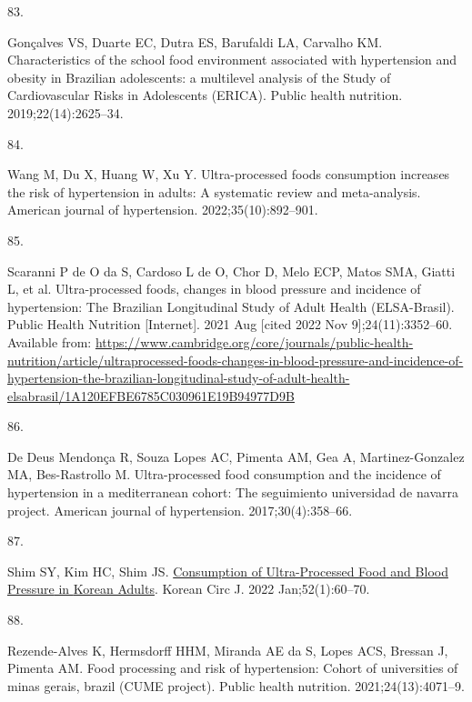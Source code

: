 \documentclass[
]{article}
\newlength{\cslhangindent}
\newlength{\csllabelwidth}
\newlength{\cslentryspacingunit} %
\newenvironment{CSLReferences}[2] %
 {%
  \setlength{\parindent}{0pt}
  \ifodd #1
  \let\oldpar\par
  \def\par{\hangindent=\cslhangindent\oldpar}
  \fi
  \setlength{\parskip}{#2\cslentryspacingunit}
 }%
 {}
\newcommand{\CSLLeftMargin}[1]{\parbox[t]{\csllabelwidth}{#1}}
\newcommand{\CSLRightInline}[1]{\parbox[t]{\linewidth - \csllabelwidth}{#1}\break}
\begin{document}
\begin{CSLReferences}{0}{0}
\leavevmode{}%
\CSLLeftMargin{83. }%
\CSLRightInline{Gonçalves VS, Duarte EC, Dutra ES, Barufaldi LA,
Carvalho KM. Characteristics of the school food environment associated
with hypertension and obesity in Brazilian adolescents: a multilevel
analysis of the Study of Cardiovascular Risks in Adolescents (ERICA).
Public health nutrition. 2019;22(14):2625--34. }

\leavevmode{}%
\CSLLeftMargin{84. }%
\CSLRightInline{Wang M, Du X, Huang W, Xu Y. Ultra-processed foods
consumption increases the risk of hypertension in adults: {A} systematic
review and meta-analysis. American journal of hypertension.
2022;35(10):892--901. }

\leavevmode{}%
\CSLLeftMargin{85. }%
\CSLRightInline{Scaranni P de O da S, Cardoso L de O, Chor D, Melo ECP,
Matos SMA, Giatti L, et al. Ultra-processed foods, changes in blood
pressure and incidence of hypertension: The {Brazilian Longitudinal
Study} of {Adult Health} ({ELSA-Brasil}). Public Health Nutrition
{[}Internet{]}. 2021 Aug {[}cited 2022 Nov 9{]};24(11):3352--60.
Available from:
\url{https://www.cambridge.org/core/journals/public-health-nutrition/article/ultraprocessed-foods-changes-in-blood-pressure-and-incidence-of-hypertension-the-brazilian-longitudinal-study-of-adult-health-elsabrasil/1A120EFBE6785C030961E19B94977D9B}}

\leavevmode{}%
\CSLLeftMargin{86. }%
\CSLRightInline{De Deus Mendonça R, Souza Lopes AC, Pimenta AM, Gea A,
Martinez-Gonzalez MA, Bes-Rastrollo M. Ultra-processed food consumption
and the incidence of hypertension in a mediterranean cohort: The
seguimiento universidad de navarra project. American journal of
hypertension. 2017;30(4):358--66. }

\leavevmode{}%
\CSLLeftMargin{87. }%
\CSLRightInline{Shim SY, Kim HC, Shim JS.
\href{https://doi.org/10.4070/kcj.2021.0228}{Consumption of
{Ultra-Processed Food} and {Blood Pressure} in {Korean Adults}}. Korean
Circ J. 2022 Jan;52(1):60--70. }

\leavevmode{}%
\CSLLeftMargin{88. }%
\CSLRightInline{Rezende-Alves K, Hermsdorff HHM, Miranda AE da S, Lopes
ACS, Bressan J, Pimenta AM. Food processing and risk of hypertension:
{Cohort} of universities of minas gerais, brazil ({CUME} project).
Public health nutrition. 2021;24(13):4071--9. }


\end{CSLReferences}
\end{document}
